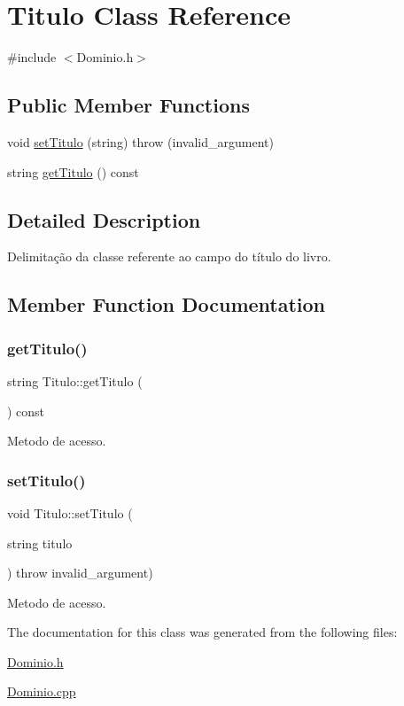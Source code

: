 \hypertarget{class_titulo}{}\section{Titulo Class Reference}
\label{class_titulo}


{\ttfamily \#include $<$Dominio.\+h$>$}

\subsection*{Public Member Functions}
\begin{DoxyCompactItemize}
\item 
void \hyperlink{class_titulo_ac4b3e70d24f498a9085ae9d01d51ef12}{set\+Titulo} (string)  throw (invalid\+\_\+argument)
\item 
string \hyperlink{class_titulo_ad13d7166263fe5b8053532a820165390}{get\+Titulo} () const
\end{DoxyCompactItemize}


\subsection{Detailed Description}
Delimitação da classe referente ao campo do título do livro. 

\subsection{Member Function Documentation}
\mbox{\label{class_titulo_ad13d7166263fe5b8053532a820165390}} 
\subsubsection{\texorpdfstring{get\+Titulo()}{getTitulo()}}
{\footnotesize\ttfamily string Titulo\+::get\+Titulo (\begin{DoxyParamCaption}{ }\end{DoxyParamCaption}) const\hspace{0.3cm}{\ttfamily [inline]}}

Metodo de acesso. \mbox{\label{class_titulo_ac4b3e70d24f498a9085ae9d01d51ef12}} 
\subsubsection{\texorpdfstring{set\+Titulo()}{setTitulo()}}
{\footnotesize\ttfamily void Titulo\+::set\+Titulo (\begin{DoxyParamCaption}\item[{string}]{titulo }\end{DoxyParamCaption}) throw  invalid\+\_\+argument) }

Metodo de acesso. 

The documentation for this class was generated from the following files\+:\begin{DoxyCompactItemize}
\item 
\hyperlink{_dominio_8h}{Dominio.\+h}\item 
\hyperlink{_dominio_8cpp}{Dominio.\+cpp}\end{DoxyCompactItemize}
